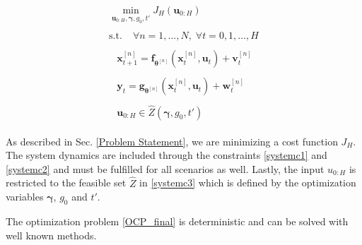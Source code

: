\begin{subequations}
\begin{align}
\begin{split}
\min\limits_{\boldsymbol{u}_{0:H},\boldsymbol{\gamma}, g_0, t' }  J_H(\boldsymbol{u}_{0:H})
\end{split}\\
\begin{split}
\text{s.t.}\; &\forall n = 1,...,N, \;  \forall t = 0,1,...,H
\end{split}\\
\begin{split}\label{systemc1}
&\boldsymbol{x}_{t+1}^{[n]} = \boldsymbol{f}_{\boldsymbol{\theta}^{[n]}} \left( \boldsymbol{x}_{t}^{[n]} , \boldsymbol{u}_t \right) + \boldsymbol{v}_{t}^{[n]}
\end{split}\\
\begin{split}\label{systemc2}
&\boldsymbol{y}_{t} = \boldsymbol{g}_{\boldsymbol{\theta}^{[n]}} \left( \boldsymbol{x}_{t}^{[n]}, \boldsymbol{u}_t \right) + \boldsymbol{w}_{t}^{[n]}
\end{split}\\
\begin{split}\label{systemc3}
 &\boldsymbol{u}_{0:H} \in \hat{Z}(\boldsymbol{\gamma}, g_0, t')
\end{split}
\end{align}
\label{OCP_final}
\end{subequations}

As described in Sec. \ref{Problem Statement}, we are minimizing a cost function $J_H$. The system dynamics are included through the constraints \eqref{systemc1} and \eqref{systemc2} and must be fulfilled for all scenarios as well. Lastly, the input $u_{0:H}$ is restricted to the feasible set $\hat{Z}$ in \eqref{systemc3} which is defined by the optimization variables $\boldsymbol{\gamma}$, $g_0$ and $t'$.

The optimization problem \eqref{OCP_final} is deterministic and can be solved with well known methods. 




